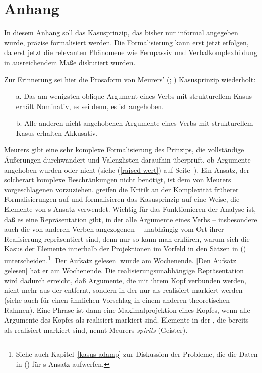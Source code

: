 {\section{Anhang}
\label{kasus-anhang}

In diesem Anhang soll das Kasusprinzip, das bisher nur informal angegeben wurde,
präzise formalisiert werden. Die Formalisierung kann erst jetzt erfolgen, da erst jetzt die
relevanten Phänomene wie Fernpassiv und Verbalkomplexbildung in ausreichendem
Maße diskutiert wurden.

Zur Erinnerung sei hier die Prosaform von
Meurers' (\citeyear{Meurers99b}; \citeyear[Kapitel~10.4.1.4]{Meurers2000b})
Kasusprinzip wiederholt:

\begin{itemize}
\item[a.] Das am wenigsten oblique Argument eines Verbs mit strukturellem Kasus erhält Nominativ,
          es sei denn, es ist angehoben.
\item[b.] Alle anderen nicht angehobenen Argumente eines Verbs mit strukturellem Kasus erhalten Akkusativ.
\end{itemize}

\noindent
Meurers gibt eine sehr komplexe Formalisierung des Prinzips, die vollständige Äußerungen
durchwandert und Valenzlisten daraufhin überprüft, ob Argumente angehoben wurden oder nicht (siehe
(\ref{raised-wert}) auf Seite~\pageref{raised-wert}). Ein Ansatz, der solcherart komplexe Beschränkungen 
nicht benötigt, ist dem von Meurers vorgeschlagenen vorzuziehen. 
%
\citet[--57]{MdK2001a} greifen die Kritik an der Komplexität früherer Formalisierungen
auf und formalisieren das Kasusprinzip auf eine Weise, die Elemente von \prz{}s Ansatz \citeyearpar{Prze99}
verwendet. Wichtig für das Funktionieren der Analyse ist, daß es eine Repräsentation
gibt, in der alle Argumente eines Verbs -- insbesondere auch die von anderen Verben angezogenen -- unabhängig
vom Ort ihrer Realisierung repräsentiert sind, denn nur so kann man erklären,
warum sich die Kasus der Elemente innerhalb der Projektionen im Vorfeld in
den Sätzen in () unterscheiden.\footnote{
  Siehe auch Kapitel~\ref{kasus-adamp} zur Diskussion der Probleme, die die Daten in () für \prz{}s Ansatz aufwerfen.%
}
\eal
\label{bsp-der-aufsatz-gelesen-zwei}
\ex {}[Der Aufsatz gelesen] wurde am Wochenende.
\ex {}[Den Aufsatz gelesen] hat er am Wochenende.
\zl
Die realisierungsunabhängige Repräsentation wird dadurch erreicht, daß
Argumente, die mit ihrem Kopf verbunden werden, nicht mehr aus der \subcatl entfernt,
sondern in der \subcatl nur als realisiert markiert werden (siehe auch  
für einen ähnlichen Vorschlag in einem anderen theoretischen Rahmen). 
Eine Phrase ist dann eine Maximalprojektion eines Kopfes, wenn alle Argumente des Kopfes als realisiert markiert sind.
Elemente in der \subcatl, die bereits als realisiert markiert sind, nennt Meurers \emph{spirits}
(Geister).

}
